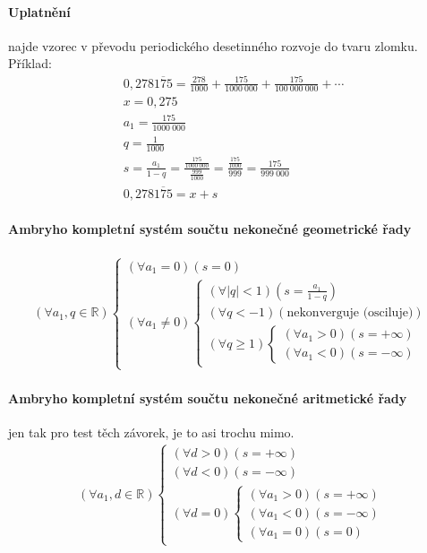 \documentclass[12pt]{article}
\begin{document}
\paragraph{Uplatnění} najde vzorec v převodu periodického desetinného rozvoje do tvaru zlomku. Příklad:
\begin{align*}
0,278\overline{175} = \frac{278}{1000} + \frac{175}{1000~000} + \frac{175}{100~000~000} + \dotsb\\
x = 0,275\\
a_1 =  \frac{175}{1000~000}\\
q =  \frac{1}{1000}\\
s =  \frac{a_1}{1-q} = \frac{ \frac{175}{1000~000}}{\frac{999}{1000}} =  \frac{ \frac{175}{1000}}{999} =  \frac{175}{999~000}\\
0,278\overline{175} = x + s
\end{align*}
\paragraph{Ambryho kompletní systém součtu nekonečné geometrické řady}
\begin{align}
\left(\forall a_1,q \in \mathbb{R} \right)
\begin{cases}
   (\forall a_1 = 0)(s =0)\\
   (\forall a_1 \neq 0) \begin{cases}
   ( \forall |q| < 1) ( s = \frac{a_1}{1-q})\\
   ( \forall q < -1) (\text{nekonverguje (osciluje)})\\
   ( \forall q \geq 1)\begin{cases}
   	(\forall a_1 > 0) (s =+ \infty)\\
   	(\forall a_1 < 0) (s =- \infty)
   	\end{cases}
   \end{cases}
\end{cases}
\end{align}
\paragraph{Ambryho kompletní systém součtu nekonečné aritmetické řady} jen tak pro test těch závorek, je to asi trochu mimo.
\begin{align}
( \forall a_1, d \in \mathbb{R}) \begin{cases}
( \forall d>0) (s = + \infty)\\
( \forall d<0) (s = - \infty)\\
( \forall d=0)\begin{cases}
( \forall a_1>0) (s = + \infty)\\
( \forall a_1<0) (s = - \infty)\\
( \forall a_1=0) (s = 0)
\end{cases}
\end{cases}
\end{align}
\end{document}
